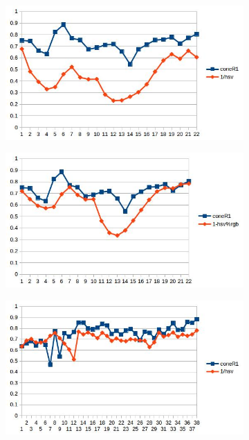 \documentclass[12pt]{report}
\begin{document}
\begin{figure}
\centering
\begin{subfigure}{.49\linewidth}
  \includegraphics[width=1\linewidth]{figures/correlations/db/room_hsv.jpg}
  \caption{}
\end{subfigure}
\hfill
\begin{subfigure}{.49\linewidth}
  \includegraphics[width=1\linewidth]{figures/correlations/rgb/room_hsv.jpg}
  \caption{}
\end{subfigure}
\hfill
\begin{subfigure}{.49\linewidth}
  \includegraphics[width=1\linewidth]{figures/correlations/db/campus_hsv.jpg}

\end{subfigure}
\end{figure}
\end{document}
